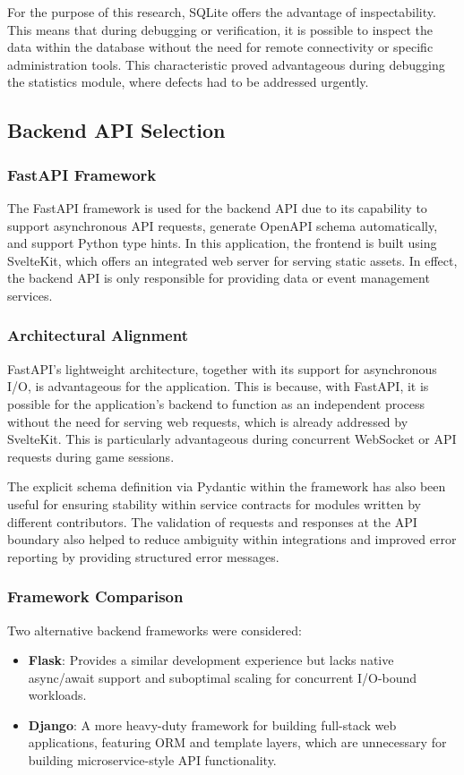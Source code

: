 For the purpose of this research, SQLite offers the advantage of inspectability. This means that during debugging or verification, it is possible to inspect the data within the database without the need for remote connectivity or specific administration tools. This characteristic proved advantageous during debugging the statistics module, where defects had to be addressed urgently.

\vspace{\baselineskip}

\subsection{Backend API Selection}

\subsubsection{FastAPI Framework}
The FastAPI framework is used for the backend API due to its capability to support asynchronous API requests, generate OpenAPI schema automatically, and support Python type hints. In this application, the frontend is built using SvelteKit, which offers an integrated web server for serving static assets. In effect, the backend API is only responsible for providing data or event management services.

\subsubsection{Architectural Alignment}
FastAPI's lightweight architecture, together with its support for asynchronous I/O, is advantageous for the application. This is because, with FastAPI, it is possible for the application's backend to function as an independent process without the need for serving web requests, which is already addressed by SvelteKit. This is particularly advantageous during concurrent WebSocket or API requests during game sessions.

The explicit schema definition via Pydantic within the framework has also been useful for ensuring stability within service contracts for modules written by different contributors. The validation of requests and responses at the API boundary also helped to reduce ambiguity within integrations and improved error reporting by providing structured error messages.

\subsubsection{Framework Comparison}
Two alternative backend frameworks were considered:
\begin{itemize}
    \item \textbf{Flask}: Provides a similar development experience but lacks native async/await support and suboptimal scaling for concurrent I/O-bound workloads.
    \item \textbf{Django}: A more heavy-duty framework for building full-stack web applications, featuring ORM and template layers, which are unnecessary for building microservice-style API functionality.
\end{itemize}

